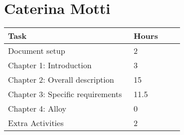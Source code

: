 \section{Caterina Motti}
\begin{center}
	\begin{tabular}{@{}p{0.5\linewidth} p{0.2\linewidth}@{}}
		\hline
		\textbf{Task} & \textbf{Hours} \\ \hline
            Document setup & 2 \\ \hline
            Chapter 1: Introduction & 3 \\ \hline
            Chapter 2: Overall description & 15 \\ \hline
            Chapter 3: Specific requirements & 11.5 \\ \hline
            Chapter 4: Alloy & 0 \\ \hline
            Extra Activities & 2 \\ \hline
	\end{tabular}
\end{center}
